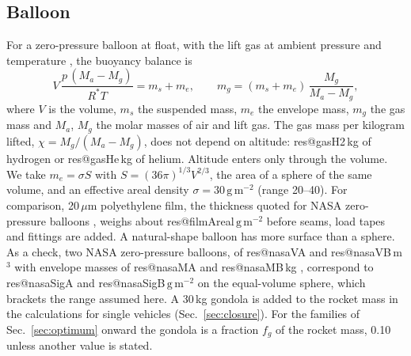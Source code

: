 \documentclass[11pt,a4paper]{article}
\makeatletter
\newcommand{\R}[1]{\csname res@#1\endcsname}
\makeatother
\begin{document}
\subsection{Balloon}
\label{sec:balloon}

For a zero-pressure balloon at float, with the lift gas at ambient pressure and temperature \cite{yajima2009}, the buoyancy balance is
\begin{equation}
V\,\frac{p\,(M_a-M_g)}{R^{*}T}=m_s+m_e ,\qquad m_g=(m_s+m_e)\,\frac{M_g}{M_a-M_g},
\label{eq:balloon}
\end{equation}
where $V$ is the volume, $m_s$ the suspended mass, $m_e$ the envelope mass, $m_g$ the gas mass and $M_a$, $M_g$ the molar masses of air and lift gas. The gas mass per kilogram lifted, $\chi=M_g/(M_a-M_g)$, does not depend on altitude: \R{gasH2}\,kg of hydrogen or \R{gasHe}\,kg of helium. Altitude enters only through the volume. We take $m_e=\sigma S$ with $S=(36\pi)^{1/3}V^{2/3}$, the area of a sphere of the same volume, and an effective areal density $\sigma=30\,\mathrm{g\,m^{-2}}$ (range 20--40). For comparison, 20\,$\mu$m polyethylene film, the thickness quoted for NASA zero-pressure balloons \cite{csbf}, weighs about \R{filmAreal}\,$\mathrm{g\,m^{-2}}$ before seams, load tapes and fittings are added. A natural-shape balloon has more surface than a sphere. As a check, two NASA zero-pressure balloons, of \R{nasaVA} and \R{nasaVB}\,m$^3$ with envelope masses of \R{nasaMA} and \R{nasaMB}\,kg \cite{nasaldb}, correspond to \R{nasaSigA} and \R{nasaSigB}\,$\mathrm{g\,m^{-2}}$ on the equal-volume sphere, which brackets the range assumed here. A 30\,kg gondola is added to the rocket mass in the calculations for single vehicles (Sec.~\ref{sec:closure}). For the families of Sec.~\ref{sec:optimum} onward the gondola is a fraction $f_g$ of the rocket mass, 0.10 unless another value is stated.
\end{document}
